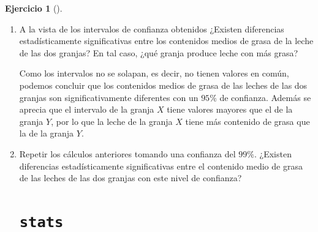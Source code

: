 \documentclass[
  a4paper,
]{scrreport}
\theoremstyle{definition}
\newtheorem{exercise}{Ejercicio}[chapter]
\theoremstyle{remark}
\begin{document}
\begin{exercise}[]
\begin{enumerate}
\begin{tcolorbox}
  \end{tcolorbox}
\item
  A la vista de los intervalos de confianza obtenidos ¿Existen
  diferencias estadísticamente significativas entre los contenidos
  medios de grasa de la leche de las dos granjas? En tal caso, ¿qué
  granja produce leche con más grasa?

  \begin{tcolorbox}[enhanced jigsaw, breakable, toptitle=1mm, colbacktitle=quarto-callout-tip-color!10!white, rightrule=.15mm, opacityback=0, opacitybacktitle=0.6, titlerule=0mm, coltitle=black, colframe=quarto-callout-tip-color-frame, colback=white, bottomtitle=1mm, leftrule=.75mm, toprule=.15mm, title=\textcolor{quarto-callout-tip-color}{\faLightbulb}\hspace{0.5em}{Solución}, arc=.35mm, bottomrule=.15mm, left=2mm]

  Como los intervalos no se solapan, es decir, no tienen valores en
  común, podemos concluir que los contenidos medios de grasa de las
  leches de las dos granjas son significativamente diferentes con un
  \(95\%\) de confianza. Además se aprecia que el intervalo de la granja
  \(X\) tiene valores mayores que el de la granja \(Y\), por lo que la
  leche de la granja \(X\) tiene más contenido de grasa que la de la
  granja \(Y\).

  \end{tcolorbox}
\item
  Repetir los cálculos anteriores tomando una confianza del \(99\%\).
  ¿Existen diferencias estadísticamente significativas entre el
  contenido medio de grasa de las leches de las dos granjas con este
  nivel de confianza?

  \begin{tcolorbox}[enhanced jigsaw, breakable, toptitle=1mm, colbacktitle=quarto-callout-tip-color!10!white, rightrule=.15mm, opacityback=0, opacitybacktitle=0.6, titlerule=0mm, coltitle=black, colframe=quarto-callout-tip-color-frame, colback=white, bottomtitle=1mm, leftrule=.75mm, toprule=.15mm, title=\textcolor{quarto-callout-tip-color}{\faLightbulb}\hspace{0.5em}{Solución}, arc=.35mm, bottomrule=.15mm, left=2mm]

  \section{\texorpdfstring{\texttt{stats}}{stats}}


\end{tcolorbox}
\end{enumerate}
\end{exercise}
\end{document}
